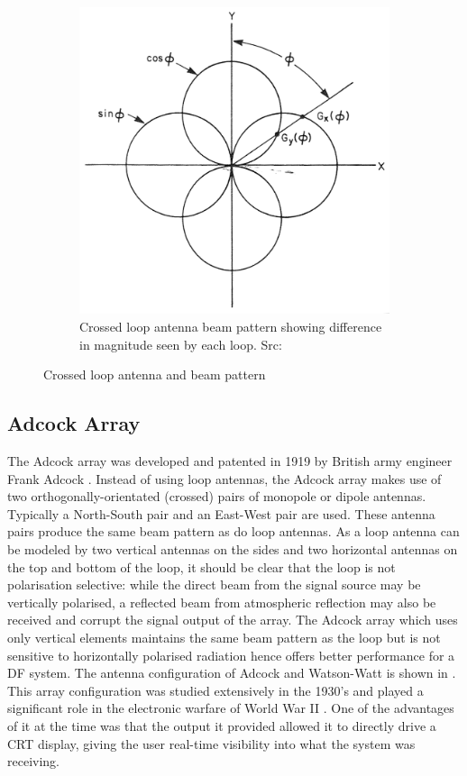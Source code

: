 \begin{figure}
\begin{subfigure}[b]{0.4\textwidth}
    \includegraphics[width=\textwidth]{./img/lit_review/loop_antenna_crossed_beam}
    \caption{Crossed loop antenna beam pattern showing difference in magnitude seen by each loop. Src: \cite{jenkins1991smallaperture}}
  \end{subfigure}
  \caption{Crossed loop antenna and beam pattern}
  \label{fig:lit_crossed_loop_antenna}
\end{figure}

\subsection{Adcock Array}
The Adcock array was developed and patented in 1919 by British army engineer Frank Adcock \cite{gething1991radio}.
Instead of using loop antennas, the Adcock array makes use of two orthogonally-orientated (crossed) pairs of monopole or dipole antennas. Typically a North-South pair and an East-West pair are used. These antenna pairs produce the same beam pattern as do loop antennas. 
As a loop antenna can be modeled by two vertical antennas on the sides and two horizontal antennas on the top and bottom of the loop, it should be clear that the loop is not polarisation selective: while the direct beam from the signal source may be vertically polarised, a reflected beam from atmospheric reflection may also be received and corrupt the signal output of the array.
The Adcock array which uses only vertical elements maintains the same beam pattern as the loop but is not sensitive to horizontally polarised radiation hence offers better performance for a DF system.
The antenna configuration of Adcock and Watson-Watt is shown in .
This array configuration was studied extensively in the 1930's and played a significant role in the electronic warfare of World War II \cite{gething1991radio}. One of the advantages of it at the time was that the output it provided allowed it to directly drive a CRT display, giving the user real-time visibility into what the system was receiving\cite{jenkins1991smallaperture}. 

